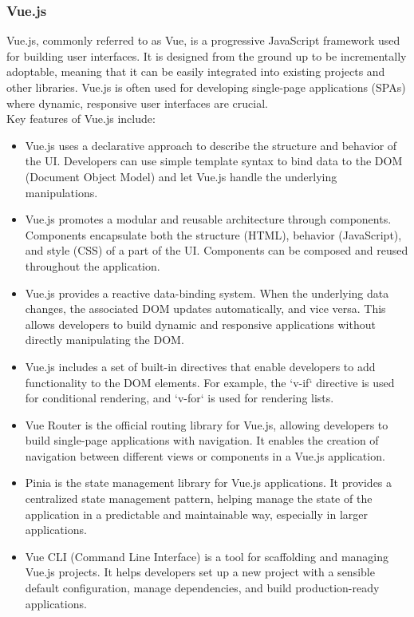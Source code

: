 \subsubsection{Vue.js}\label{vuejs}
Vue.js, commonly referred to as Vue, is a progressive JavaScript framework used for building user interfaces. It is designed from the ground up to be incrementally adoptable, meaning that it can be easily integrated into existing projects and other libraries. Vue.js is often used for developing single-page applications (SPAs) where dynamic, responsive user interfaces are crucial.\vspace{5mm} \\
Key features of Vue.js include:
\begin{itemize}
  \item Vue.js uses a declarative approach to describe the structure and behavior of the UI. Developers can use simple template syntax to bind data to the DOM (Document Object Model) and let Vue.js handle the underlying manipulations.
  \item Vue.js promotes a modular and reusable architecture through components. Components encapsulate both the structure (HTML), behavior (JavaScript), and style (CSS) of a part of the UI. Components can be composed and reused throughout the application.
  \item Vue.js provides a reactive data-binding system. When the underlying data changes, the associated DOM updates automatically, and vice versa. This allows developers to build dynamic and responsive applications without directly manipulating the DOM.
  \item Vue.js includes a set of built-in directives that enable developers to add functionality to the DOM elements. For example, the `v-if` directive is used for conditional rendering, and `v-for` is used for rendering lists.
  \item Vue Router is the official routing library for Vue.js, allowing developers to build single-page applications with navigation. It enables the creation of navigation between different views or components in a Vue.js application.
  \item Pinia is the state management library for Vue.js applications. It provides a centralized state management pattern, helping manage the state of the application in a predictable and maintainable way, especially in larger applications.
  \item Vue CLI (Command Line Interface) is a tool for scaffolding and managing Vue.js projects. It helps developers set up a new project with a sensible default configuration, manage dependencies, and build production-ready applications.
\end{itemize}
